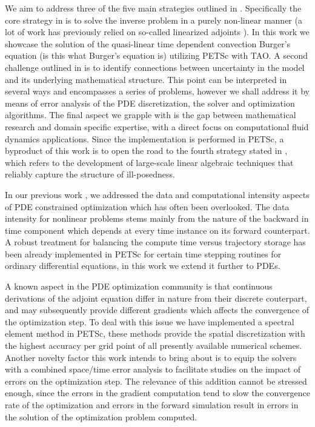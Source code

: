 \documentclass[10pt]{article}
\begin{document}
{We aim to address three of the five main strategies outlined in
\cite{Brown_2008}. Specifically the core strategy in \cite{Brown_2008}
is to solve the inverse problem in a purely
non-linear manner (a lot of work has previously relied on so-called linearized adjoints \cite{}).
In this work we showcase the solution of the quasi-linear time dependent
convection Burger's equation (is this what Burger's equation is) utilizing PETSc with TAO.
A second  challenge outlined in \cite{Brown_2008} is to identify connections between uncertainty in the model
and its underlying mathematical structure. This point can be
interpreted in several ways and encompasses a series of problems,
however we shall address it by means of error analysis of the
PDE discretization, the solver and optimization algorithms. The final
aspect we grapple with is the gap between mathematical
research and domain specific expertise, with a direct focus on
computational fluid dynamics applications. Since the implementation is
performed in PETSc, a byproduct of this work is to open
the road to the fourth strategy stated in \cite{Brown_2008}, which
refers to the development of large-scale linear algebraic techniques
that reliably capture the structure of ill-posedness.

In our previous work \cite{schanen_2016}, we addressed the data and
computational intensity aspects of PDE constrained optimization which
has often been overlooked.  The data intensity for nonlinear problems
stems mainly from the nature of the backward in time component which
depends at every time instance on its forward counterpart. A robust
treatment for balancing the compute time versus trajectory storage has
been already implemented in PETSc for certain time stepping routines
for ordinary differential equations, in this work we extend it further
to PDEs.

A known aspect in the PDE optimization community is that continuous
derivations of the adjoint equation differ in nature from their
discrete couterpart, and may subsequently provide different gradients
which affects the convergence of the optimization step. To deal with
this issue we have implemented a spectral element method in PETSc,
these methods provide the spatial discretization with the highest
accuracy per grid point of all presently available numerical
schemes. Another novelty factor this work intends to bring about is to
equip the solvers with a combined space/time error analysis to
facilitate studies on the impact of errors on the optimization
step. The relevance of this addition cannot be stressed enough, since
the errors in the gradient computation tend to slow the convergence
rate of the optimization and errors in the forward simulation result
in errors in the solution of the optimization problem computed.

}
\end{document}
